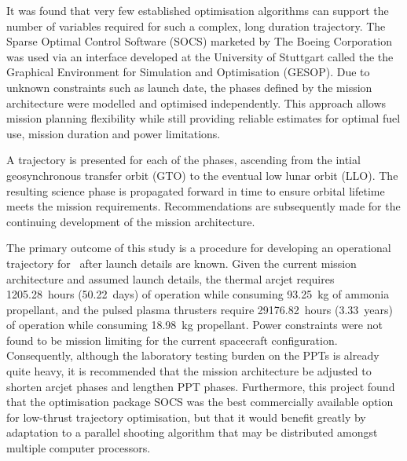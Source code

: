 It was found that very few established optimisation algorithms can support the number of variables required for such a complex, long duration trajectory. The Sparse Optimal Control Software (SOCS) marketed by The Boeing Corporation was used via an interface developed at the University of Stuttgart called the the Graphical Environment for Simulation and Optimisation (GESOP). Due to unknown constraints such as launch date, the phases defined by the mission architecture were modelled and optimised independently. This approach allows mission planning flexibility while still providing reliable estimates for optimal fuel use, mission duration and power limitations.

A trajectory is presented for each of the phases, ascending from the intial geosynchronous transfer orbit (GTO) to the eventual low lunar orbit (LLO). The resulting science phase is propagated forward in time to ensure orbital lifetime meets the mission requirements. Recommendations are subsequently made for the continuing development of the mission architecture.

The primary outcome of this study is a procedure for developing an operational trajectory for \BW\ after launch details are known. Given the current mission architecture and assumed launch details, the thermal arcjet requires 1205.28~hours (50.22~days) of operation while consuming 93.25~kg of ammonia propellant, and the pulsed plasma thrusters require 29176.82~hours (3.33~years) of operation while consuming 18.98~kg propellant. Power constraints were not found to be mission limiting for the current spacecraft configuration. Consequently, although the laboratory testing burden on the PPTs is already quite heavy, it is recommended that the mission architecture be adjusted to shorten arcjet phases and lengthen PPT phases. Furthermore, this project found that the optimisation package SOCS was the best commercially available option for low-thrust trajectory optimisation, but that it would benefit greatly by adaptation to a parallel shooting algorithm that may be distributed amongst multiple computer processors.

\vfill